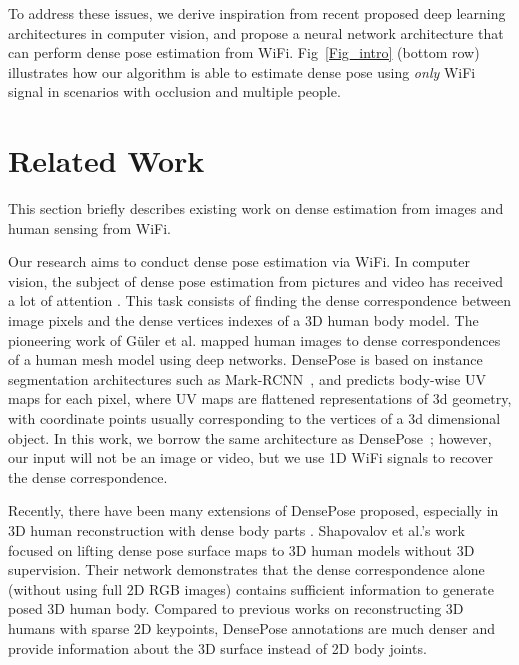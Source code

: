 \documentclass[sigconf, anonymous=false]{acmart}
\begin{document}
To address these issues, we derive inspiration from recent proposed deep learning architectures in computer vision, and propose a neural network architecture that can perform dense pose estimation from WiFi. Fig~\ref{Fig_intro} (bottom row) illustrates how our algorithm is able to estimate dense pose using {\em only} WiFi signal in scenarios with occlusion and multiple people.

\section{Related Work}
This section briefly describes existing work on dense estimation from images and human sensing from WiFi. 

Our research aims to conduct dense pose estimation via WiFi. In computer vision, the subject of dense pose estimation from pictures and video has received a lot of attention \cite{DensePose,ContinuousSurfaceEmbeddings,bristow2015dense,zhou2016learning}. This task consists of finding the dense correspondence between image pixels and the dense vertices indexes of a 3D human body model. The pioneering work of G{\"{u}}ler et al. \cite{DensePose} mapped human images to dense correspondences of a human mesh model using deep networks. DensePose is based on instance segmentation architectures such as Mark-RCNN~\cite{Mask-RCNN}, and predicts body-wise UV maps for each pixel, where UV maps are flattened representations of 3d geometry, with coordinate points usually corresponding to the vertices of a 3d dimensional object. In this work, we borrow the same architecture as DensePose~\cite{DensePose}; however, our input will not be an image or video, but we use 1D WiFi signals to recover the dense correspondence. 

Recently, there have been many extensions of DensePose proposed, especially in 3D human reconstruction with dense body parts \cite{DenseRac,tex2shape,densebody,3d-from-dense-parts}. Shapovalov et al.'s \cite{DensePose3D} work focused on lifting dense pose surface maps to 3D human models without 3D supervision. Their network demonstrates that the dense correspondence alone (without using full 2D RGB images) contains sufficient information to generate posed 3D human body. Compared to previous works on reconstructing 3D humans with sparse 2D keypoints, DensePose annotations are much denser and provide information about the 3D surface instead of 2D body joints.  
\end{document}
